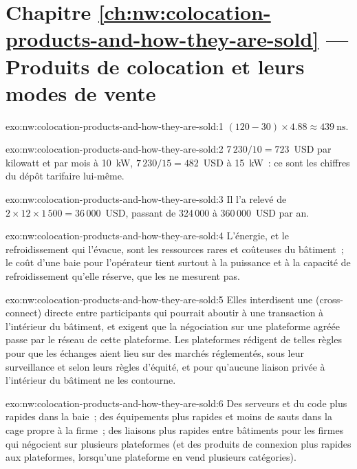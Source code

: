 \section*{Chapitre \ref{ch:nw:colocation-products-and-how-they-are-sold} --- Produits de colocation et leurs modes de vente}

\begin{solution}{exo:nw:colocation-products-and-how-they-are-sold:1}
$(120 - 30) \times 4.88 \approx \qty{439}{\nano\second}$.
\end{solution}

\begin{solution}{exo:nw:colocation-products-and-how-they-are-sold:2}
$7\,230/10 = 723$~USD par kilowatt et par mois à \qty{10}{\kilo\watt}, $7\,230/15 = 482$~USD à \qty{15}{\kilo\watt}~: ce sont les chiffres du dépôt tarifaire lui-même.
\end{solution}

\begin{solution}{exo:nw:colocation-products-and-how-they-are-sold:3}
Il l'a relevé de $2 \times 12 \times 1\,500 = 36\,000$~USD, passant de 324\,000 à 360\,000~USD par an.
\end{solution}

\begin{solution}{exo:nw:colocation-products-and-how-they-are-sold:4}
L'énergie, et le refroidissement qui l'évacue, sont les ressources rares et coûteuses du bâtiment~; le coût d'une baie pour l'opérateur tient surtout à
la puissance et à la capacité de refroidissement qu'elle réserve, que les  ne mesurent pas.
\end{solution}

\begin{solution}{exo:nw:colocation-products-and-how-they-are-sold:5}
Elles interdisent une  (cross-connect) directe entre participants qui pourrait aboutir à une transaction à l'intérieur du bâtiment, et exigent que la
négociation sur une plateforme agréée passe par le réseau de cette plateforme. Les plateformes rédigent de telles règles pour que les échanges aient lieu sur des marchés réglementés, sous leur surveillance et
selon leurs règles d'équité, et pour qu'aucune liaison privée à l'intérieur du bâtiment ne les contourne.
\end{solution}

\begin{solution}{exo:nw:colocation-products-and-how-they-are-sold:6}
Des serveurs et du code plus rapides dans la baie~; des équipements plus rapides et moins de sauts dans la cage propre à la firme~; des liaisons plus rapides
entre bâtiments pour les firmes qui négocient sur plusieurs plateformes (et des produits de connexion plus rapides aux plateformes, lorsqu'une plateforme en vend plusieurs catégories).
\end{solution}

